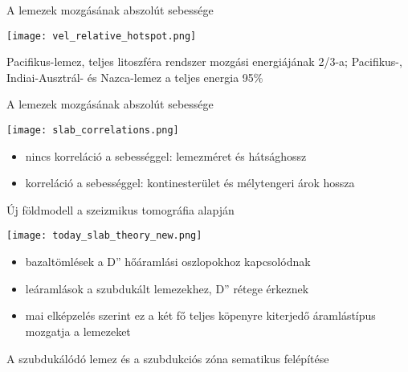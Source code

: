 \documentclass{beamer}
\begin{document}
\begin{frame}{A lemezek mozgásának abszolút sebessége}
    \begin{center}
        \texttt{[image: vel\_relative\_hotspot.png]}
    \end{center}
    Pacifikus-lemez, teljes litoszféra rendszer mozgási energiájának 2/3-a; Pacifikus-, Indiai-Ausztrál- és Nazca-lemez a teljes energia 95\%
\end{frame}


\begin{frame}{A lemezek mozgásának abszolút sebessége}
    \begin{center}
        \texttt{[image: slab\_correlations.png]}
    \end{center}
    \begin{itemize}
        \item nincs korreláció a sebességgel: lemezméret és hátsághossz
        \item korreláció a sebességgel: kontinesterület és mélytengeri árok hossza
    \end{itemize}
\end{frame}


\begin{frame}{Új földmodell a szeizmikus tomográfia alapján}
    \begin{center}
        \texttt{[image: today\_slab\_theory\_new.png]}
    \end{center}
    \begin{itemize}
        \item bazaltömlések a D'' hőáramlási oszlopokhoz kapcsolódnak
        \item leáramlások a szubdukált lemezekhez, D'' rétege érkeznek
        \item mai elképzelés szerint ez a két fő teljes köpenyre kiterjedő áramlástípus mozgatja a lemezeket
    \end{itemize}
\end{frame}


\begin{frame}{A szubdukálódó lemez és a szubdukciós zóna sematikus felépítése}
    \begin{center}
    \begin{minipage}[c]{0.88\textwidth}
    \end{minipage}
    \end{center}
\end{frame}
\end{document}
